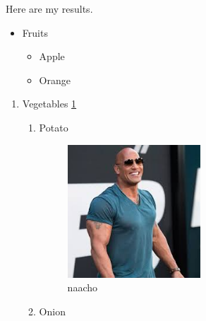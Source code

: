 \documentclass[a4paper,12pt]{article}
\begin{document}
	Here are my results.
	\begin{itemize}
		\item{Fruits}
		\begin{itemize}
			\item {Apple}
				\item{Orange} 
	
	\end{itemize}
	
	\end{itemize}
   \begin{enumerate}
   	\item Vegetables
   	\ref{Oniona}
   	\begin{enumerate}
   		\item {Potato}
   		\begin{figure}[h]
   			\centering
   			\includegraphics[width=0.5\textwidth]{index.jpeg}
   
   			\caption{naacho}
   			\label{Oniona}
   			\end{figure} 
   		
   		
   		
   		
   		\item {Onion}
   	\end{enumerate} 
   \end{enumerate}
\end{document}
